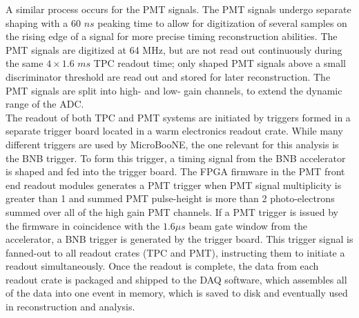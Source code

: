 A similar process occurs for the PMT signals. The PMT signals undergo separate shaping with a 60 $ns$ peaking time to allow for digitization of several samples on the rising edge of a signal for more precise timing reconstruction abilities. The PMT signals are digitized at 64 MHz, but are not read out continuously during the same $4 \times 1.6$ $ms$ TPC readout time; only shaped PMT signals above a small discriminator threshold are read out and stored for later reconstruction. The PMT signals are split into high- and low- gain channels, to extend the dynamic range of the ADC.\\

The readout of both TPC and PMT systems are initiated by triggers formed in a separate trigger board located in a warm electronics readout crate. While many different triggers are used by MicroBooNE, the one relevant for this analysis is the BNB trigger. To form this trigger, a timing signal from the BNB accelerator is shaped and fed into the trigger board. The FPGA firmware in the PMT front end readout modules generates a PMT trigger when PMT signal multiplicity is greater than 1 and summed PMT pulse-height is more than 2 photo-electrons summed over all of the high gain PMT channels. If a PMT trigger is issued by the firmware in coincidence with the $1.6 \mu s$ beam gate window from the accelerator, a BNB trigger is generated by the trigger board. This trigger signal is fanned-out to all readout crates (TPC and PMT), instructing them to initiate a readout simultaneously. Once the readout is complete, the data from each readout crate is packaged and shipped to the DAQ software, which assembles all of the data into one event in memory, which is saved to disk and eventually used in reconstruction and analysis.
